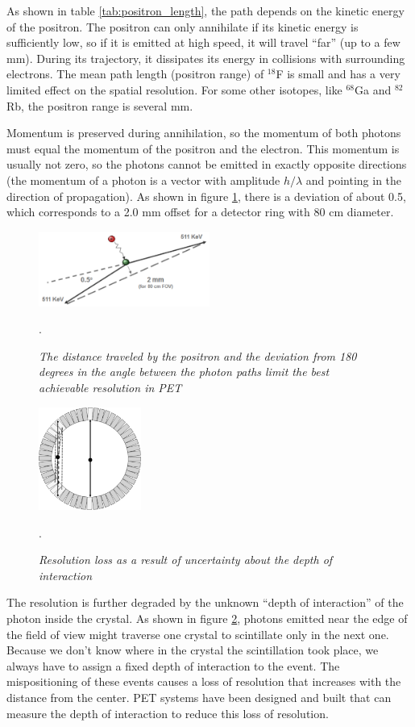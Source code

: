 \documentclass[11pt,oneside]{article}
\begin{document}
As shown in table \ref{tab:positron_length}, the path depends on the
kinetic energy of the positron. The positron can only annihilate if
its kinetic energy is sufficiently low, so if it is emitted at high
speed, it will travel ``far'' (up to a few mm). During its trajectory,
it dissipates its energy in collisions with surrounding electrons. The
mean path length (positron range) of $^{18}$F is small and has a very
limited effect on the spatial resolution. For some other isotopes,
like $^{68}$Ga and $^{82}$Rb, the positron range is several mm.

Momentum is preserved during annihilation, so the momentum of both photons
must equal the momentum of the positron and the electron. This momentum is
usually not zero, so the photons cannot be emitted in exactly opposite
directions (the momentum of a photon is a vector with amplitude $h/\lambda$
and pointing in the direction of propagation). As shown in figure
\ref{fig:positron_error}, there is a deviation of about 0.5\textdegree, which
corresponds to a 2.0 mm offset for a detector ring with 80 cm diameter.
%
\begin{figure}[tb]
\centering
\includegraphics[width=0.5\textwidth]{figs/fig_positron_error.pdf}
\caption{\label{fig:positron_error} \emph{The distance traveled by the
positron and the deviation from 180 degrees in the angle between the photon
paths limit the best achievable resolution in PET}}.
\end{figure}


\begin{figure}[tb]
\centering
\includegraphics[width=0.3\textwidth]{figs/fig_doi.pdf}
\caption{\label{fig:doi} \emph{Resolution loss as a result of
    uncertainty about the depth of interaction}}.
\end{figure}
%
The resolution is further degraded by the unknown ``depth of
interaction'' of the photon inside the crystal. As shown in figure
\ref{fig:doi}, photons emitted near the edge of the field of view
might traverse one crystal to scintillate only in the next
one. Because we don't know where in the crystal the scintillation took
place, we always have to assign a fixed depth of interaction to the
event. The mispositioning of these events causes a loss of resolution
that increases with the distance from the center. PET systems have
been designed and built that can measure the depth of interaction to
reduce this loss of resolution.
\end{document}
